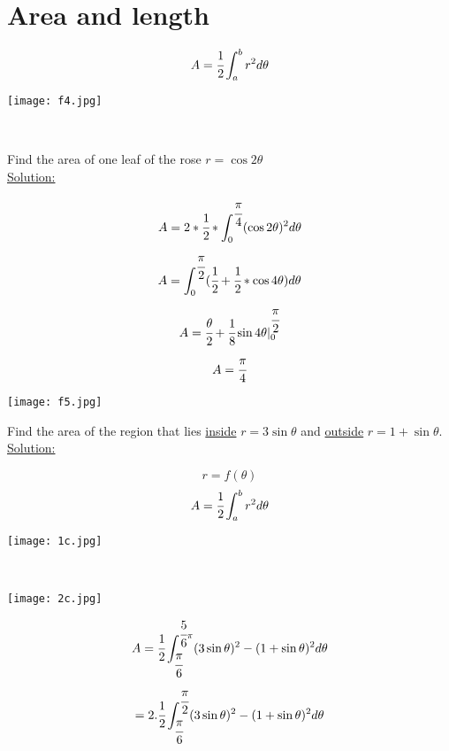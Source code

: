 \section{Area and length}
\begin{minipage}{0.5\textwidth}
$$A=\cfrac{1}{2}\int_{a}^{b}r^2 d\theta$$
\end{minipage}
\begin{minipage}{0.5\textwidth}
\texttt{[image: f4.jpg]}
\end{minipage}\\
\begin{example}
Find the area of one leaf of the rose $r=\cos2\theta$\\
{\color{smalt(darkpowderblue)}\underline{Solution:}}
\begin{minipage}{0.5\textwidth}
  $$A=2*\cfrac{1}{2} *\int_{0}^{\cfrac{\pi}{4}} (\cos 2\theta)^2 d\theta$$
  $$A= \int_{0}^{\cfrac{\pi}{2}}(\cfrac{1}{2}+\cfrac{1}{2}*\cos 4\theta )d\theta$$
  $$A=\cfrac{\theta}{2}+\cfrac{1}{8}\sin 4\theta |_{0}^{\cfrac{\pi}{2}}$$
  $$A=\cfrac{\pi}{4}$$ 
\end{minipage}
\begin{minipage}{0.4\textwidth}
\texttt{[image: f5.jpg]}
\end{minipage}
\end{example}
\noindent{\color{smalt(darkpowderblue)}\rule{\linewidth}{.2mm}}
\begin{example}
Find the area of the region that lies \underline{inside} $r=3\sin\theta$ and \underline{outside} $r=1+\sin\theta.$\\
{\color{smalt(darkpowderblue)} \underline{Solution:}} 
\begin{minipage}{0.5\textwidth}
$$r=f(\theta)$$
$$A=\cfrac{1}{2}\int_a^b r^2d\theta$$
\end{minipage}
\begin{minipage}{0.6\textwidth}
\texttt{[image: 1c.jpg]}
\end{minipage}\\
\begin{minipage}{0.5\textwidth}
\texttt{[image: 2c.jpg]}
\end{minipage}
\begin{minipage}{0.5\textwidth}
$$A=\cfrac{1}{2}\int_{\cfrac{\pi}{6}}^{\cfrac{5}{6}\pi}(3\sin\theta)^2-(1+\sin\theta)^2 d\theta$$
$$=2.\cfrac{1}{2}\int_{\cfrac{\pi}{6}}^{\cfrac{\pi}{2}}(3\sin\theta)^2-(1+\sin\theta)^2 d\theta$$
\end{minipage}
\end{example}
